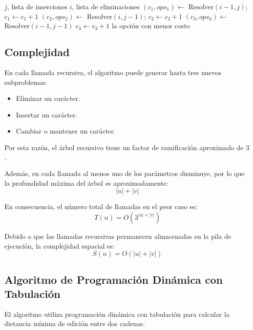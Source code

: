 \documentclass[12pt]{article}
\begin{document}
\begin{algorithm}[H]
\caption{Divide y vencerás}
\begin{algorithmic}[1]
            \State \Return $j$, lista de inserciones
        \EndIf
            \State \Return $i$, lista de eliminaciones
        \EndIf
        \State $(c_1, ops_1) \gets$ Resolver$(i-1, j)$; $c_1 \gets c_1 + 1$
        \State $(c_2, ops_2) \gets$ Resolver$(i, j-1)$; $c_2 \gets c_2 + 1$
        \State $(c_3, ops_3) \gets$ Resolver$(i-1, j-1)$
            \State $c_3 \gets c_3 + 1$
        \EndIf
        \State \Return la opción con menor costo
    \EndFunction
\EndFunction
\end{algorithmic}
\end{algorithm}

\subsection*{Complejidad}

En cada llamada recursiva, el algoritmo puede generar hasta tres nuevos subproblemas:

\begin{itemize}
    \item Eliminar un carácter.
    \item Insertar un carácter.
    \item Cambiar o mantener un carácter.
\end{itemize}

Por esta razón, el árbol recursivo tiene un factor de ramificación aproximado de \(3\).

Además, en cada llamada al menos uno de los parámetros disminuye, por lo que la profundidad máxima del árbol es aproximadamente:
$$|u| + |v|$$

En consecuencia, el número total de llamadas en el peor caso es:
$$T(n)=O(3^{|u|+|v|})$$

Debido a que las llamadas recursivas permanecen almacenadas en la pila de ejecución, la complejidad espacial es:
$$S(n)=O(|u|+|v|)$$

\subsection*{Algoritmo de Programación Dinámica con Tabulación}

El algoritmo utiliza programación dinámica con tabulación para calcular la distancia mínima de edición entre dos cadenas.
\end{document}
